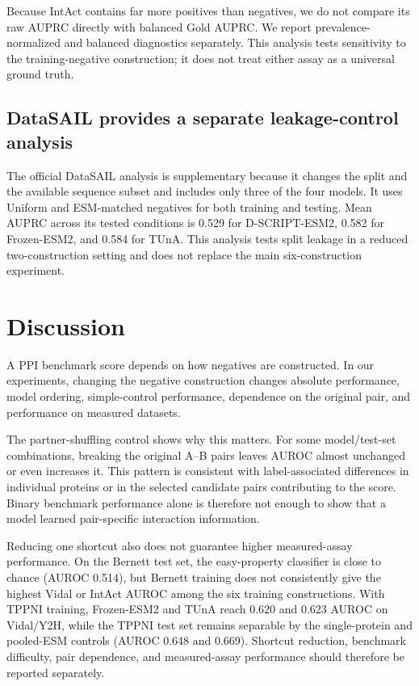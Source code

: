 \documentclass{article}
\begin{document}
Because IntAct contains far more positives than negatives, we do not compare
its raw AUPRC directly with balanced Gold AUPRC. We report
prevalence-normalized and balanced diagnostics separately. This analysis tests
sensitivity to the training-negative construction; it does not treat either
assay as a universal ground truth.

\subsection{DataSAIL provides a separate leakage-control analysis}

The official DataSAIL analysis is supplementary because it changes the split
and the available sequence subset and includes only three of the four models.
It uses Uniform and ESM-matched negatives for both training and testing. Mean
AUPRC across its tested conditions is 0.529 for D-SCRIPT-ESM2, 0.582 for
Frozen-ESM2, and 0.584 for TUnA. This analysis tests split leakage in a reduced
two-construction setting and does not replace the main six-construction
experiment.

\section{Discussion}

A PPI benchmark score depends on how negatives are constructed. In our
experiments, changing the negative construction changes absolute performance,
model ordering, simple-control performance, dependence on the original pair,
and performance on measured datasets.

The partner-shuffling control shows why this matters. For some model/test-set
combinations, breaking the original A--B pairs leaves AUROC almost unchanged or
even increases it. This pattern is consistent with label-associated differences in individual
proteins or in the selected candidate pairs contributing to the score. Binary
benchmark performance alone is therefore not enough to show that a model
learned pair-specific interaction information.

Reducing one shortcut also does not guarantee higher measured-assay
performance. On the Bernett test set, the easy-property classifier is close to
chance (AUROC 0.514), but Bernett training does not consistently give the
highest Vidal or IntAct AUROC among the six training constructions. With TPPNI
training, Frozen-ESM2 and TUnA reach 0.620 and 0.623 AUROC on Vidal/Y2H, while
the TPPNI test set remains separable by the single-protein and pooled-ESM
controls (AUROC 0.648 and 0.669). Shortcut reduction, benchmark difficulty,
pair dependence, and measured-assay performance should therefore be reported
separately.
\end{document}
